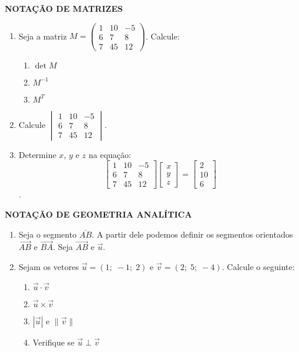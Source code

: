 \documentclass[12pt,a4paper]{article}
\begin{document}
    \textbf{NOTAÇÃO DE MATRIZES}
    \begin{enumerate}
    
        \item Seja a matriz $M = 
        \begin{pmatrix}
            1 & 10 & -5 \\
            6 & 7  & 8  \\
            7 & 45 & 12
         \end{pmatrix}$. Calcule:
        \begin{enumerate}
            \item $\det M$
            \item $M^{-1}$
            \item $M^{T}$
        \end{enumerate}
          
        \item Calcule
        $\begin{vmatrix}
            1 & 10 & -5 \\
            6 & 7  & 8  \\
            7 & 45 & 12
          \end{vmatrix}$.
          
          \item Determine $x$, $y$ e $z$ na equação:
        $$\begin{bmatrix}
            1 & 10 & -5 \\
            6 & 7  & 8  \\
            7 & 45 & 12
          \end{bmatrix}
          \begin{bmatrix}
            x \\
            y \\
            z
          \end{bmatrix}
          =
          \begin{bmatrix}
            2 \\
            10  \\
            6
          \end{bmatrix}$$.
    \end{enumerate}
          
    \textbf{NOTAÇÃO DE GEOMETRIA ANALÍTICA}
    
    \begin{enumerate}
    \item Seja o segmento $\overline{AB}$. A partir dele podemos definir os segmentos orientados $\overrightarrow{AB}$ e $\overrightarrow{BA}$. Seja $\vec{AB}$ e $\vec{u}$.
    
    \item Sejam os vetores $\vec{u} = (1;\;-1;\;2)$ e $\vec{v} = (2;\;5;\;-4)$. Calcule o seguinte:
    \begin{enumerate}
        \item $\vec{u} \cdot \vec{v}$
        \item $\vec{u} \times \vec{v}$
        \item $|\vec{u}|$ e $\|\vec{v}\|$
        \item Verifique se $\vec{u} \perp \vec{v}$
      \end{enumerate}
    \end{enumerate}
\end{document}
